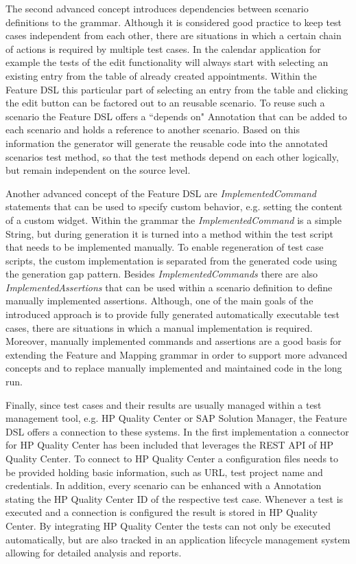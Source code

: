 \documentclass{sig-alternate-05-2015}
\begin{document}
The second advanced concept introduces dependencies between scenario definitions to the grammar.
Although it is considered good practice to keep test cases independent from each other, there are situations in which a certain chain of actions is required by multiple test cases.
In the calendar application for example the tests of the edit functionality will always start with selecting an existing entry from the table of already created appointments.
Within the Feature DSL this particular part of selecting an entry from the table and clicking the edit button can be factored out to an reusable scenario.
To reuse such a scenario the Feature DSL offers a ``depends on" Annotation that can be added to each scenario and holds a reference to another scenario.
Based on this information the generator will generate the reusable code into the annotated scenarios test method, so that the test methods depend on each other logically, but remain independent on the source level.

Another advanced concept of the Feature DSL are \textit{ImplementedCommand} statements that can be used to specify custom behavior, e.g. setting the content of a custom widget.
Within the grammar the \textit{ImplementedCommand} is a simple String, but during generation it is turned into a method within the test script that needs to be implemented manually. 
To enable regeneration of test case scripts, the custom implementation is separated from the generated code using the generation gap pattern.
Besides \textit{ImplementedCommands} there are also \textit{ImplementedAssertions} that can be used within a scenario definition to define manually implemented assertions.
Although, one of the main goals of the introduced approach is to provide fully generated automatically executable test cases, there are situations in which a manual implementation is required. 
Moreover, manually implemented commands and assertions are a good basis for extending the Feature and Mapping grammar in order to support more advanced concepts and to replace manually implemented and maintained code in the long run.

Finally, since test cases and their results are usually managed within a test management tool, e.g. HP Quality Center or SAP Solution Manager, the Feature DSL offers a connection to these systems.
In the first implementation a connector for HP Quality Center has been included that leverages the REST API of HP Quality Center.
To connect to HP Quality Center a configuration files needs to be provided holding basic information, such as URL, test project name and credentials.
In addition, every scenario can be enhanced with a Annotation stating the HP Quality Center ID of the respective test case.
Whenever a test is executed and a connection is configured the result is stored in HP Quality Center.
By integrating HP Quality Center the tests can not only be executed automatically, but are also tracked in an application lifecycle management system allowing for detailed analysis and reports.
\end{document}
